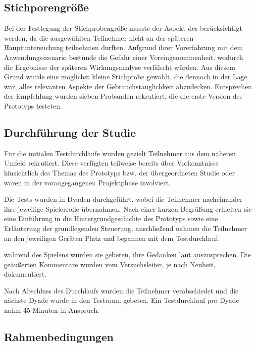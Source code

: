 \subsection{Stichporengröße}\label{sec:pre-study-sample}

Bei der Festlegung der Stichprobengröße musste der Aspekt des  berücksichtigt werden, da die ausgewählten Teilnehmer nicht an der späteren Hauptuntersuchung teilnehmen durften. Aufgrund ihrer Vorerfahrung mit dem Anwendungsszenario bestünde die Gefahr einer Voreingenommenheit, wodurch die Ergebnisse der späteren Wirkungsanalyse verfälscht würden. Aus diesem Grund wurde eine möglichst kleine Stichprobe gewählt, die dennoch in der Lage war, alles relevanten Aspekte der Gebrauchstauglichkeit abzudecken. Entsprechen der Empfehlung \citet[S. 3088]{turner_determining_2006} wurden sieben Probanden rekrutiert, die die erste Version des Prototyps testeten.

\subsection{Durchführung der Studie}

Für die initialen Testdurchläufe wurden gezielt Teilnehmer aus dem näheren Umfeld rekrutiert. Diese verfügten teilweise bereits über Vorkenntnisse hinsichtlich des Themas des Prototyps bzw. der übergeordneten Studie oder waren in der vorangegangenen Projektphase involviert.

Die Tests wurden in Dyaden durchgeführt, wobei die Teilnehmer nacheinander ihre jeweilige Spielerrolle übernahmen. Nach einer kurzen Begrüßung erhielten sie eine Einführung in die Hintergrundgeschichte des Prototyps sowie eine Erläuterung der grundlegenden Steuerung. anschließend nahmen die Teilnehmer an den jeweiligen Geräten Platz und begannen mit dem Testdurchlauf.

während des Spielens wurden sie gebeten, ihre Gedanken laut auszusprechen. Die geäußerten Kommentare wurden vom Versuchsleiter, je nach Neuheit, dokumentiert.

Nach Abschluss des Durchlaufs wurden die Teilnehmer verabschiedet und die nächste Dyade wurde in den Testraum gebeten. Ein Testdurchlauf pro Dyade nahm 45 Minuten in Anspruch.

\subsection{Rahmenbedingungen}\label{sec:pre-study-rahmen}

